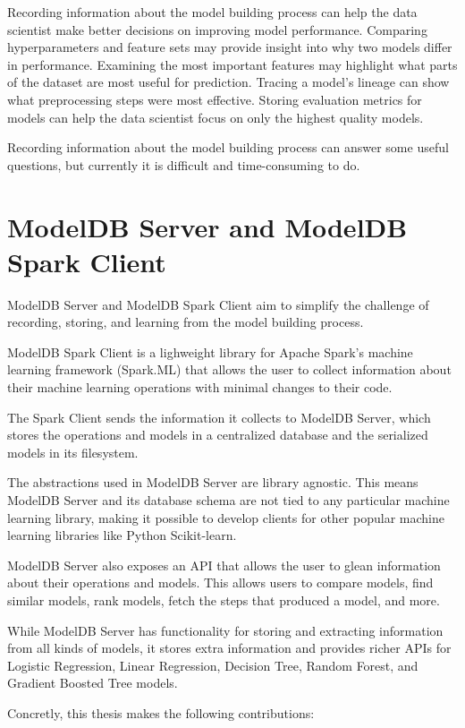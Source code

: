 Recording information about the model building process can help the data scientist 
make better decisions on improving model performance. Comparing hyperparameters
and feature sets may provide insight into why two models differ in performance. 
Examining the most important features may highlight what parts of the dataset are
most useful for prediction. Tracing a model's lineage can show what preprocessing
steps were most effective. Storing evaluation metrics for models can help
the data scientist focus on only the highest quality models. 

Recording information about the model building process can answer some useful 
questions, but currently it is difficult and time-consuming to do.

\section{ModelDB Server and ModelDB Spark Client}

ModelDB Server and ModelDB Spark Client aim to simplify the challenge of recording, storing,
and learning from the model building process. 

ModelDB Spark Client is a lighweight library for Apache Spark's machine learning framework (Spark.ML) 
that allows the user to collect information about their machine learning operations with minimal changes to their code. 

The Spark Client sends the information it collects to ModelDB Server, which 
stores the operations and models in a centralized database and the serialized 
models in its filesystem. 

The abstractions used in ModelDB Server are library agnostic. This means ModelDB Server 
and its database schema are not tied to any particular machine learning library, making
it possible to develop clients for other popular machine learning libraries like Python Scikit-learn.

ModelDB Server also exposes an API that allows the user to glean information about their
operations and models. This allows users to compare models, find
similar models, rank models, fetch the steps that produced a model, and more. 

While ModelDB Server has functionality for storing and extracting information from
all kinds of models, it stores extra information and provides richer APIs for 
Logistic Regression, Linear Regression, Decision Tree, Random Forest, and 
Gradient Boosted Tree models. 

Concretly, this thesis makes the following contributions:

